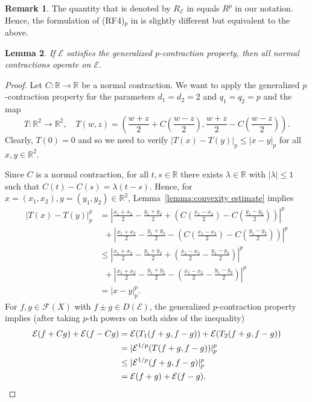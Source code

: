 \documentclass[a4paper,11pt,reqno]{amsart}
\newtheorem{lemma}{Lemma}[section]
\theoremstyle{definition}
\newtheorem{remark}[lemma]{Remark}
\numberwithin{equation}{section}
\newcommand{\cE}{{\mathcal E}}
\newcommand{\cF}{{\mathcal F}}
\newcommand{\R}{{\mathbb R}}
\newcommand{\1}{\mathds{1}}
\begin{document}
\begin{remark}
 The quantity that is denoted by $R_\cE$ in \cite{KS25} equals $R^p$ in our notation. Hence, the formulation of (RF4)$_p$ in \cite{KS25} is slightly different but equivalent to the above. 
\end{remark}



\begin{lemma}\label{lemma:contraction property for p resistance}
 If $\cE$ satisfies the generalized $p$-contraction property, then all normal contractions  operate on $\cE$. 
\end{lemma}
\begin{proof}
 Let $C \colon \R \to \R$ be a normal contraction. We want to apply the generalized $p$-contraction property for the parameters $d_1 = d_2 = 2$ and $q_1 = q_2 = p$ and the map 
 $$T \colon \R^2 \to \R^2, \quad T(w,z) = (\frac{w+z}{2} + C(\frac{w-z}{2}),\frac{w+z}{2} - C(\frac{w-z}{2})).  $$
 Clearly,  $T(0) =  0$ and so we need to verify $|T(x) - T(y)|_p \leq |x-y|_p$ for all $x,y \in \R^2$. 
 
Since $C$ is a normal contraction, for all $t,s \in \R$ there exists $\lambda \in  \R$ with $|\lambda| \leq 1$ such that $C(t) - C(s) = \lambda (t-s)$. Hence, for $x = (x_1,x_2),y=(y_1,y_2) \in \R^2$,  Lemma~\ref{lemma:convexity estimate} implies
 \begin{align*}
  |T(x) - T(y)|_p^p &= \left|\frac{x_1+x_2}{2} - \frac{y_1+y_2}{2} + \left(C(\frac{x_1-x_2}{2}) - C(\frac{y_1-y_2}{2})\right)\right|^p\\
  & \,\, \,+ \left|\frac{x_1+x_2}{2} - \frac{y_1+y_2}{2} - \left(C(\frac{x_1-x_2}{2})  - C(\frac{y_1-y_2}{2})\right)\right|^p\\
  &\leq  \left|\frac{x_1+x_2}{2} - \frac{y_1+y_2}{2} + \left(\frac{x_1-x_2}{2} - \frac{y_1-y_2}{2}\right)\right|^p\\
  & \,\, \,+ \left|\frac{x_1+x_2}{2} - \frac{y_1+y_2}{2} - \left(\frac{x_1-x_2}{2}  - \frac{y_1-y_2}{2}\right)\right|^p\\
  &= |x-y|_p^p.
 \end{align*}
 For $f,g \in \cF(X)$ with $f \pm g \in D(\cE)$, the generalized $p$-contraction property implies (after taking $p$-th powers on both sides of the inequality) 
 \begin{align*}
  \cE(f + Cg) + \cE(f - Cg) &= \cE(T_1(f + g,f-g)) + \cE(T_2(f + g,f-g))\\
  &= |\cE^{1/p}(T(f+g,f-g))|_p^p\\
  &\leq |\cE^{1/p}(f+g,f-g)|_p^p\\
  &= \cE(f+g) + \cE(f-g). \hfill \qedhere
 \end{align*}
\end{proof}
\end{document}
